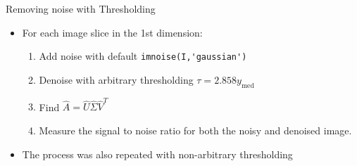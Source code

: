 \documentclass[aspectratio=169,xcolor=dvipsnames]{beamer}
\begin{document}
	\begin{frame}[fragile]{Removing noise with Thresholding}
		\begin{itemize}
			\item For each image slice in the 1st dimension:
			\begin{enumerate}
				\item Add noise with default \verb*|imnoise(I,'gaussian')|
				\item Denoise with arbitrary thresholding $\tau = 2.858y_{\text{med}}$
				\item Find $\hat{A} = \hat{U}\hat{\Sigma}\hat{V}^{T}$
				\item Measure the signal to noise ratio for both the noisy and denoised image.
			\end{enumerate}
			\item The process was also repeated with non-arbitrary thresholding
		\end{itemize}
		

\end{frame}
\end{document}
